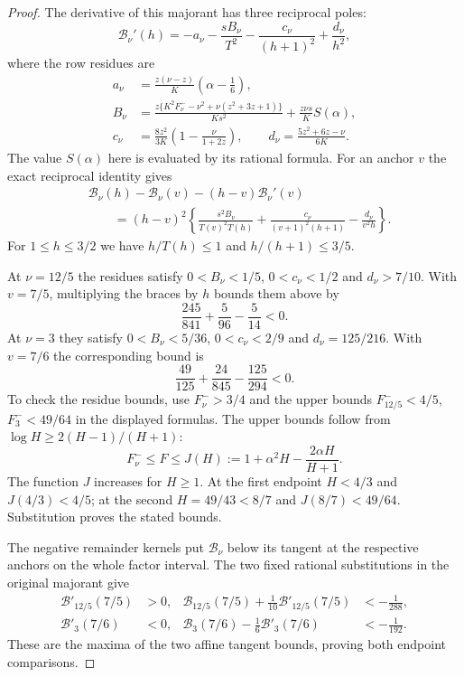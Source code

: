 \begin{proof}
The derivative of this majorant has three reciprocal poles:
\[
 \mathcal B_\nu'(h)
 =-a_\nu-\frac{sB_\nu}{T^2}-\frac{c_\nu}{(h+1)^2}
                                      +\frac{d_\nu}{h^2},
\]
where the row residues are
\begin{align*}
 a_\nu&=\frac{z(\nu-z)}K\left(\alpha-\frac16\right),\\
 B_\nu&=\frac{z\{K^2F^-_\nu-\nu^2+\nu(z^2+3z+1)\}}{Ks^2}
                  +\frac{z\nu s}K S(\alpha),\\
 c_\nu&=\frac{8z^2}{3K}\left(1-\frac\nu{1+2z}\right),\qquad
 d_\nu=\frac{5z^2+6z-\nu}{6K}.
\end{align*}
The value $S(\alpha)$ here is evaluated by its rational formula.
For an anchor $v$ the exact reciprocal identity gives
\begin{align*}
 &\mathcal B_\nu(h)-\mathcal B_\nu(v)
                  -(h-v)\mathcal B_\nu'(v)\\
 &\qquad=(h-v)^2\left\{
   \frac{s^2B_\nu}{T(v)^2T(h)}
  +\frac{c_\nu}{(v+1)^2(h+1)}-\frac{d_\nu}{v^2h}\right\}.
\end{align*}
For $1\le h\le3/2$ we have $h/T(h)\le1$ and
$h/(h+1)\le3/5$.

At $\nu=12/5$ the residues satisfy
$0<B_\nu<1/5$, $0<c_\nu<1/2$ and $d_\nu>7/10$.
With $v=7/5$, multiplying the braces by $h$ bounds them above by
\[
 \frac{245}{841}+\frac5{96}-\frac5{14}<0.
\]
At $\nu=3$ they satisfy
$0<B_\nu<5/36$, $0<c_\nu<2/9$ and $d_\nu=125/216$.
With $v=7/6$ the corresponding bound is
\[
 \frac{49}{125}+\frac{24}{845}-\frac{125}{294}<0.
\]
To check the residue bounds, use $F^-_\nu>3/4$ and the upper bounds
$F^-_{12/5}<4/5$, $F^-_3<49/64$ in the displayed formulas.
The upper bounds follow from $\log H\ge2(H-1)/(H+1)$:
\[
 F^-_\nu\le F\le J(H):=1+\alpha^2H-\frac{2\alpha H}{H+1}.
\]
The function $J$ increases for $H\ge1$. At the first endpoint $H<4/3$
and $J(4/3)<4/5$; at the second $H=49/43<8/7$ and
$J(8/7)<49/64$. Substitution proves the stated bounds.

The negative remainder kernels put $\mathcal B_\nu$ below its tangent
at the respective anchors on the whole factor interval.
The two fixed rational substitutions in the original majorant give
\begin{align*}
 \mathcal B'_{12/5}(7/5)&>0,&
 \mathcal B_{12/5}(7/5)+\frac1{10}\mathcal B'_{12/5}(7/5)
                         &<-\frac1{288},\\
 \mathcal B'_3(7/6)&<0,&
 \mathcal B_3(7/6)-\frac16\mathcal B'_3(7/6)
                         &<-\frac1{192}.
\end{align*}
These are the maxima of the two affine tangent bounds, proving both
endpoint comparisons.


\end{proof}
